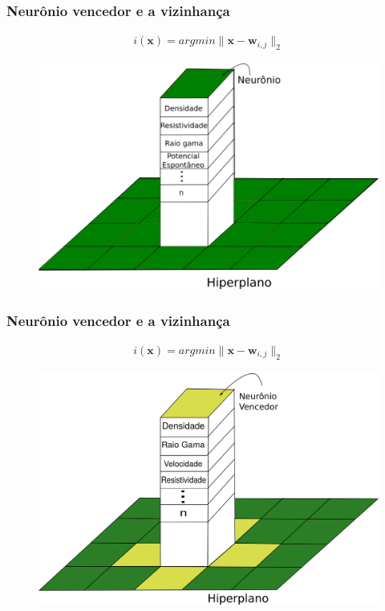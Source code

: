 \documentclass[aspectratio=10]{beamer} %
\begin{document}
\begin{frame}
	\frametitle{Neurônio vencedor e a vizinhança}	
	\begin{eqnarray}
	i(\textbf{x})= argmin \parallel \textbf{x} - \textbf{w}_{i,j} \parallel_{2} \nonumber
	\end{eqnarray}
	\begin{figure}
		\centering
		\includegraphics[scale=0.33]{Imagens/hiperplano.png}
		\label{vencedor1}
	\end{figure}
\end{frame}

\begin{frame}
	\frametitle{Neurônio vencedor e a vizinhança}
	\begin{eqnarray}
	i(\textbf{x})= argmin  \parallel \textbf{x} - \textbf{w}_{i,j} \parallel_{2} \nonumber
	\end{eqnarray}
	\begin{figure}
		\centering
		\includegraphics[scale=0.33]{Imagens/winner.png}
	\end{figure}
\end{frame}
\end{document}
